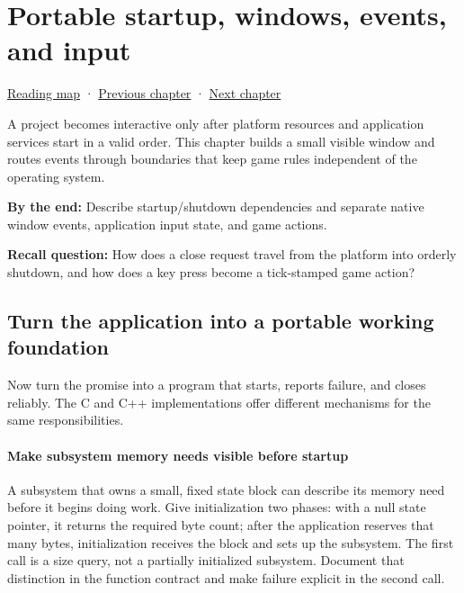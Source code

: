\hypertarget{05-engine-i-ch013}{}
\chapter{Portable startup, windows, events, and input}\label{05-engine-i-ch013-portable-startup-windows-events-and-input}

\hyperref[volume-reading-map]{Reading map} · \hyperref[05-engine-i-ch012-transactions-recovery-and-safe-project-boundaries]{Previous chapter} · \hyperref[05-engine-i-ch014-application-clocks-and-stable-input-identity]{Next chapter}

A project becomes interactive only after platform resources and application services start in a valid order. This chapter builds a small visible window and routes events through boundaries that keep game rules independent of the operating system.

\textbf{By the end:} Describe startup/shutdown dependencies and separate native window events, application input state, and game actions.

\textbf{Recall question:} How does a close request travel from the platform into orderly shutdown, and how does a key press become a tick-stamped game action?

\section{Turn the application into a portable working foundation}\label{05-engine-i-ch013-turn-the-application-into-a-portable-working-foundation}

Now turn the promise into a program that starts, reports failure, and closes reliably. The C and C++ implementations offer different mechanisms for the same responsibilities.

\subsubsection{Make subsystem memory needs visible before startup}\label{05-engine-i-ch013-make-subsystem-memory-needs-visible-before-startup}

A subsystem that owns a small, fixed state block can describe its memory need before it begins doing work. Give initialization two phases: with a null state pointer, it returns the required byte count; after the application reserves that many bytes, initialization receives the block and sets up the subsystem. The first call is a size query, not a partially initialized subsystem. Document that distinction in the function contract and make failure explicit in the second call.

